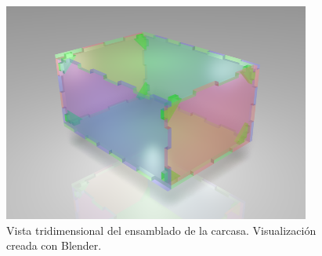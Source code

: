\begin{figure}[h]
	\centering
	\includegraphics[width=0.9\textwidth]{../images/render_caja}
	\caption[Vista tridimensional de la carcasa]{Vista tridimensional del ensamblado de la carcasa. Visualización creada con Blender.}
	\label{fig:render_caja}
\end{figure}